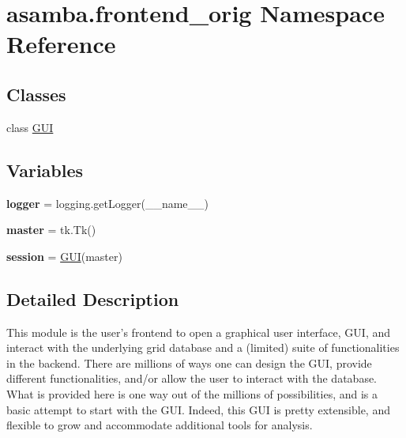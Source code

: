 \hypertarget{namespaceasamba_1_1frontend__orig}{}\section{asamba.\+frontend\+\_\+orig Namespace Reference}
\label{namespaceasamba_1_1frontend__orig}
\subsection*{Classes}
\begin{DoxyCompactItemize}
\item 
class \hyperlink{classasamba_1_1frontend__orig_1_1_g_u_i}{G\+UI}
\end{DoxyCompactItemize}
\subsection*{Variables}
\begin{DoxyCompactItemize}
\item 
\mbox{\label{namespaceasamba_1_1frontend__orig_a8f7d4b041e5a6fe255157a32d37f8bee}} 
{\bfseries logger} = logging.\+get\+Logger(\+\_\+\+\_\+name\+\_\+\+\_\+)
\item 
\mbox{\label{namespaceasamba_1_1frontend__orig_ae076744668e97068e077dc3b89519606}} 
{\bfseries master} = tk.\+Tk()
\item 
\mbox{\label{namespaceasamba_1_1frontend__orig_a2facc2cfde5e7e80a151f0b41adc5f5e}} 
{\bfseries session} = \hyperlink{classasamba_1_1frontend__orig_1_1_g_u_i}{G\+UI}(master)
\end{DoxyCompactItemize}


\subsection{Detailed Description}
\begin{DoxyVerb}This module is the user's frontend to open a graphical user interface, GUI, and interact with the 
underlying grid database and a (limited) suite of functionalities in the backend. There are millions 
of ways one can design the GUI, provide different functionalities, and/or allow the user to interact 
with the database. What is provided here is one way out of the millions of possibilities, and is a 
basic attempt to start with the GUI. Indeed, this GUI is pretty extensible, and flexible to grow and
accommodate additional tools for analysis.
\end{DoxyVerb}
 
